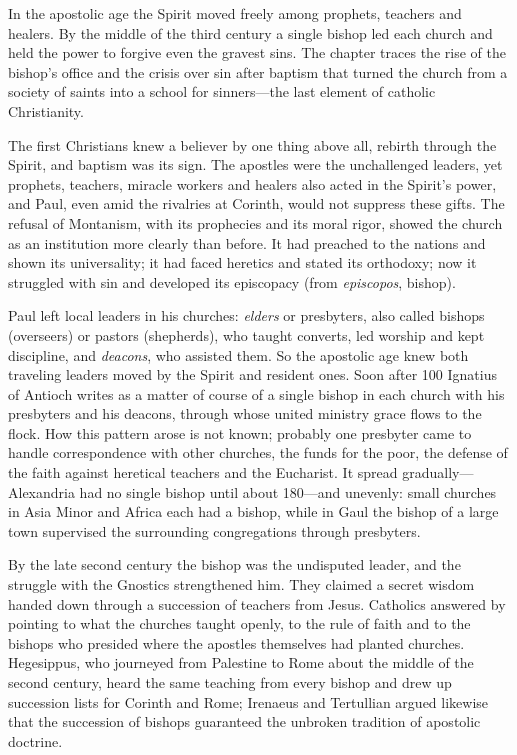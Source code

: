 
\begin{inbrief}
In the apostolic age the Spirit moved freely among prophets, teachers and healers. By the middle of
the third century a single bishop led each church and held the power to forgive even the gravest sins.
The chapter traces the rise of the bishop's office and the crisis over sin after baptism that turned
the church from a society of saints into a school for sinners---the last element of catholic
Christianity.
\end{inbrief}

The first Christians knew a believer by one thing above all, rebirth through the Spirit, and baptism
was its sign. The apostles were the unchallenged leaders, yet prophets, teachers, miracle workers and
healers also acted in the Spirit's power, and Paul, even amid the rivalries at Corinth, would not
suppress these gifts. The refusal of Montanism, with its prophecies and its moral rigor, showed the
church as an institution more clearly than before. It had preached to the nations and shown its
universality; it had faced heretics and stated its orthodoxy; now it struggled with sin and developed
its episcopacy (from \emph{episcopos}, bishop).

Paul left local leaders in his churches: \emph{elders} or presbyters, also called bishops (overseers)
or pastors (shepherds), who taught converts, led worship and kept discipline, and \emph{deacons}, who
assisted them. So the apostolic age knew both traveling leaders moved by the Spirit and resident ones.
Soon after 100 Ignatius of Antioch writes as a matter of course of a single bishop in each church with
his presbyters and his deacons, through whose united ministry grace flows to the flock.
How this pattern arose is not known; probably one presbyter came to handle correspondence with other
churches, the funds for the poor, the defense of the faith against heretical teachers and the
Eucharist. It spread gradually---Alexandria had no single bishop until about 180---and unevenly:
small churches in Asia Minor and Africa each had a bishop, while in Gaul the bishop of a large town
supervised the surrounding congregations through presbyters.

By the late second century the bishop was the undisputed leader, and the struggle with the Gnostics
strengthened him. They claimed a secret wisdom handed down through a succession of teachers from
Jesus. Catholics answered by pointing to what the churches taught openly, to the rule of faith and to the bishops who presided where the apostles themselves had planted churches. Hegesippus, who journeyed from Palestine to Rome about the middle of the second century, heard the same teaching from every bishop and drew up succession lists for
Corinth and Rome; Irenaeus and Tertullian argued likewise that the succession of bishops guaranteed
the unbroken tradition of apostolic doctrine.

